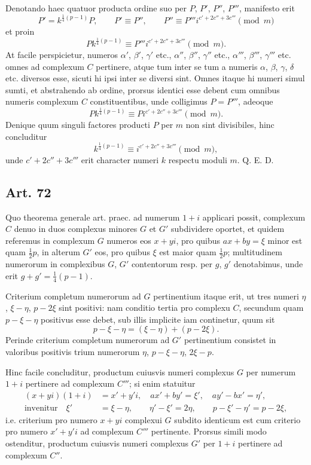 \documentclass[12pt]{article}
\newcommand{\art}[1]{\subsection*{Art. #1}}
\begin{document}
Denotando haec quatuor producta ordine suo per $P$, $P'$, $P''$, $P'''$, manifesto erit
\[
P'=k^{\frac14(p-1)}P,\qquad
P'\equiv P'',\qquad
P''\equiv P'''i^{c'+2c''+3c'''}\pmod m
\]
et proin
\[
Pk^{\frac14(p-1)}\equiv P'''i^{c'+2c''+3c'''}\pmod m.
\]
At facile perspicietur, numeros $\alpha'$, $\beta'$, $\gamma'$ etc., $\alpha''$, $\beta''$, $\gamma''$ etc., $\alpha'''$, $\beta'''$, $\gamma'''$ etc. omnes ad complexum $C$ pertinere, atque tum inter se tum a numeris $\alpha$, $\beta$, $\gamma$, $\delta$ etc. diversos esse, sicuti hi ipsi inter se diversi sint. Omnes itaque hi numeri simul sumti, et abstrahendo ab ordine, prorsus identici esse debent cum omnibus numeris complexum $C$ constituentibus, unde colligimus $P=P'''$, adeoque
\[
Pk^{\frac14(p-1)}\equiv Pi^{c'+2c''+3c'''}\pmod m.
\]
Denique quum singuli factores producti $P$ per $m$ non sint divisibiles, hinc concluditur
\[
k^{\frac14(p-1)}\equiv i^{c'+2c''+3c'''}\pmod m,
\]
unde $c'+2c''+3c'''$ erit character numeri $k$ respectu moduli $m$. Q. E. D.

\art{72}
Quo theorema generale art. praec. ad numerum $1+i$ applicari possit, complexum $C$ denuo in duos complexus minores $G$ et $G'$ subdividere oportet, et quidem referemus in complexum $G$ numeros eos $x+yi$, pro quibus $ax+by=\xi$ minor est quam $\frac12p$, in alterum $G'$ eos, pro quibus $\xi$ est maior quam $\frac12p$; multitudinem numerorum in complexibus $G$, $G'$ contentorum resp. per $g$, $g'$ denotabimus, unde erit $g+g'=\frac14(p-1)$.

Criterium completum numerorum ad $G$ pertinentium itaque erit, ut tres numeri $\eta$, $\xi-\eta$, $p-2\xi$ sint positivi: nam conditio tertia pro complexu $C$, secundum quam $p-\xi-\eta$ positivus esse debet, sub illis implicite iam continetur, quum sit
\[
p-\xi-\eta=(\xi-\eta)+(p-2\xi).
\]
Perinde criterium completum numerorum ad $G'$ pertinentium consistet in valoribus positivis trium numerorum $\eta$, $p-\xi-\eta$, $2\xi-p$.

Hinc facile concluditur, productum cuiusvis numeri complexus $G$ per numerum $1+i$ pertinere ad complexum $C'''$; si enim statuitur
\[
\begin{aligned}
(x+yi)(1+i)&=x'+y'i, \quad
ax'+by'=\xi',\quad ay'-bx'=\eta',\\
\text{invenitur}\quad
\xi'&=\xi-\eta,\qquad
\eta'-\xi'=2\eta,\qquad
p-\xi'-\eta'=p-2\xi,
\end{aligned}
\]
i.e. criterium pro numero $x+yi$ complexui $G$ subdito identicum est cum criterio pro numero $x'+y'i$ ad complexum $C'''$ pertinente. Prorsus simili modo ostenditur, productum cuiusvis numeri complexus $G'$ per $1+i$ pertinere ad complexum $C''$.
\end{document}
